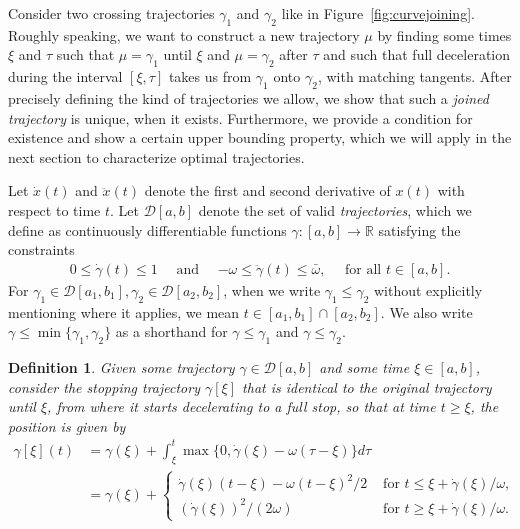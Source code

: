 \documentclass[a4paper]{article}
\theoremstyle{definition}
\theoremstyle{plain}
\newtheorem{define}{Definition\hspace{0.25em}\ignorespaces}
\begin{document}
Consider two crossing trajectories $\gamma_{1}$ and $\gamma_{2}$ like in
Figure~\ref{fig:curvejoining}. Roughly speaking, we want to construct a new
trajectory $\mu$ by finding some times $\xi$ and $\tau$ such that
$\mu = \gamma_{1}$ until $\xi$ and $\mu = \gamma_{2}$ after $\tau$ and such that
full deceleration during the interval $[\xi, \tau]$ takes us from $\gamma_{1}$
onto $\gamma_{2}$, with matching tangents.
%
After precisely defining the kind of trajectories we allow, we show that such a
\emph{joined trajectory} is unique, when it exists. Furthermore, we provide a
condition for existence and show a certain upper bounding property, which we
will apply in the next section to characterize optimal trajectories.

Let $\dot{x}(t)$ and $\ddot{x}(t)$ denote the first and second derivative of
$x(t)$ with respect to time $t$.
%
Let $\mathcal{D}[a,b]$ denote the set of valid \emph{trajectories}, which we
define as continuously differentiable functions $\gamma : [a,b] \rightarrow \mathbb{R}$
satisfying the constraints
\begin{align}
  0 \leq \dot{\gamma}(t) \leq 1 \quad \text{ and } \quad
  {-\omega} \leq \ddot{\gamma}(t) \leq \bar{\omega} , \quad \text{ for all } t \in [a,b] .
\end{align}
%
For $\gamma_{1} \in \mathcal{D}[a_{1}, b_{1}], \gamma_{2} \in \mathcal{D}[a_{2}, b_{2}]$, when
we write $\gamma_{1} \leq \gamma_{2}$ without explicitly mentioning where it applies, we mean
$t \in [a_{1}, b_{1}] \cap [a_{2}, b_{2}]$. We also write $\gamma \leq \min \{ \gamma_{1}, \gamma_{2} \}$ as a shorthand for
$\gamma \leq \gamma_{1}$ and $\gamma \leq \gamma_{2}$.

\begin{define}\label{def:stopping-trajectory}
  Given some trajectory $\gamma \in \mathcal{D}[a,b]$ and some time $\xi \in [a, b]$, consider the
  \emph{stopping trajectory} $\gamma[\xi]$ that is identical to the original trajectory until
  $\xi$, from where it starts decelerating to a full stop, so that at time
  $t \geq \xi$, the position is given by
\begin{subequations}
\begin{align}
  \gamma[\xi](t) &= \gamma(\xi) + \int_{\xi}^{t} \max\{0, \dot{\gamma}(\xi) - \omega(\tau-\xi) \} d\tau \\
                     &= \gamma(\xi) + \begin{cases}
                                        \dot{\gamma}(\xi)(t-\xi) - \omega(t-\xi)^{2} / 2 &\text{ for } t \leq \xi + \dot{\gamma}(\xi) / \omega , \\
                                        {(\dot{\gamma}(\xi))}^{2} / (2 \omega) &\text{ for } t \geq \xi + \dot{\gamma}(\xi) / \omega .
                                        \end{cases} \label{eq:underbound}
\end{align}
\end{subequations}
\end{define}
\end{document}
